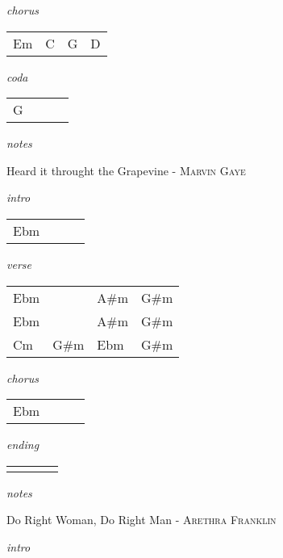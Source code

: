 \documentclass[12pt]{article}
\begin{document}
\textit{chorus}

\begin{tabular}{|P{1.25in}|P{1.25in}|P{1.25in}|P{1.25in}|}
  Em &  C &  G &  D \\
\end{tabular}

\textit{coda}

\begin{tabular}{|P{1.25in}|P{1.25in}|P{1.25in}|P{1.25in}|}
  G &   &   &   \\
\end{tabular}

\textit{notes}

\newpage

{\Huge Heard it throught the Grapevine} {\huge - \textsc{Marvin Gaye}}

\huge
\textit{intro}

\begin{tabular}{|P{1.25in}|P{1.25in}|P{1.25in}|P{1.25in}|}
  Ebm &   &   &   \\
\end{tabular}

\textit{verse}

\begin{tabular}{|P{1.25in}|P{1.25in}|P{1.25in}|P{1.25in}|}
  Ebm &   & A\#m  & G\#m  \\
  Ebm &   & A\#m  & G\#m  \\
  Cm  &  G\#m & Ebm & G\#m \\
\end{tabular}

\textit{chorus}

\begin{tabular}{|P{1.25in}|P{1.25in}|P{1.25in}|P{1.25in}|}
  Ebm &   &   &   \\
\end{tabular}

\textit{ending}

\begin{tabular}{|P{1.25in}|P{1.25in}|P{1.25in}|P{1.25in}|}
   &   &   &   \\
\end{tabular}

\textit{notes}

\newpage

{\Huge Do Right Woman, Do Right Man} {\huge - \textsc{Arethra Franklin}}

\huge
\textit{intro}
\end{document}
